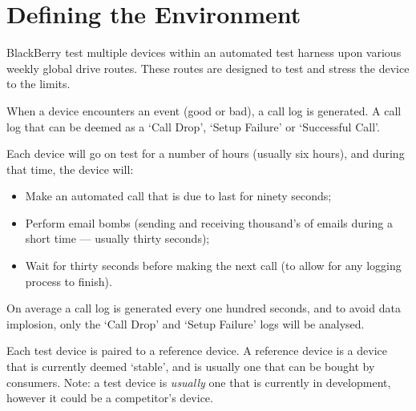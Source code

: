 \section{Defining the Environment}

BlackBerry test multiple devices within an automated test harness upon various 
weekly global drive routes. These routes are designed to test and stress the
device to the limits.

When a device encounters an event (good or bad), a call log is generated. A 
call log that can be deemed as a `Call Drop', `Setup Failure' or 
`Successful Call'. 

Each device will go on test for a number of hours (usually six hours), and 
during that time, the device will:
\begin{itemize}
  \item Make an automated call that is due to last for ninety seconds;
  \item Perform email bombs (sending and receiving thousand's of emails during 
        a short time --- usually thirty seconds);
  \item Wait for thirty seconds before making the next call (to allow for any 
        logging process to finish).
\end{itemize}

On average a call log is generated every one hundred seconds, and to avoid data 
implosion, only the `Call Drop' and `Setup Failure' logs will be analysed.

Each test device is paired to a reference device. A reference device is a device
that is currently deemed `stable', and is usually one that can be bought 
by consumers. Note: a test device is {\em usually} one that is currently in 
development, however it could be a competitor's device. 